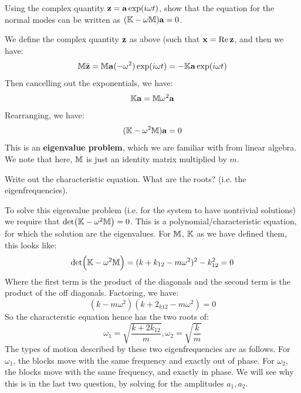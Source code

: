 \documentclass[../PHYS306Notes.tex]{subfiles}
\begin{document}
\begin{p}
Using the complex quantity $\mathbf{z} = \mathbf{a}\exp(i\omega t)$, show that the equation for the normal modes can be written as $(\mathbb{K} - \omega\mathbb{M})\mathbf{a} = 0$.
\end{p}
\begin{s}
We define the complex quantity $\mathbf{z}$ as above (such that $\mathbf{x} = \Re\mathbf{z}$, and then we have:
\[\mathbb{M}\ddot{\mathbf{z}} = \mathbb{M}\mathbf{a}(-\omega^2)\exp(i\omega t) = -\mathbb{K}\mathbf{a}\exp(i\omega t)\]
Then cancelling out the exponentials, we have:
\[\mathbb{K}\mathbf{a} = \mathbb{M}\omega^2\mathbf{a}\]
Rearranging, we have:
\[(\mathbb{K} - \omega^2\mathbb{M})\mathbf{a} = 0\]
This is an \textbf{eigenvalue problem}, which we are familiar with from linear algebra. We note that here, $\mathbb{M}$ is just an identity matrix multiplied by $m$.
\end{s}

\begin{p}
Write out the characteristic equation. What are the roots? (i.e. the eigenfrequencies).
\end{p}
\begin{s}
To solve this eigenvalue problem (i.e. for the system to have nontrivial solutions) we require that $\det(\mathbb{K} - \omega^2\mathbb{M}) = 0$. This is a polynomial/characteristic equation, for which the solution are the eigenvalues. For $\mathbb{M}$, $\mathbb{K}$ as we have defined them, this looks like:
\[\det(\mathbb{K} - \omega^2\mathbb{M}) = (k + k_{12}- m\omega^2)^2 - k_{12}^2 = 0\]
Where the first term is the product of the diagonals and the second term is the product of the off diagonals. Factoring, we have:
\[(k - m\omega^2)(k + 2_{k12} - m\omega^2) = 0\]
So the characterstic equation hence has the two roots of:
\[\omega_1 = \sqrt{\frac{k + 2k_{12}}{m}}, \omega_2 = \sqrt{\frac{k}{m}}\]
The types of motion described by these two eigenfrequencies are as follows. For $\omega_1$, the blocks move with the same frequency and exactly out of phase. For $\omega_2$, the blocks move with the same frequency, and exactly in phase. We will see why this is in the last two question, by solving for the amplitudes $a_1, a_2$.
\end{s}
\end{document}
